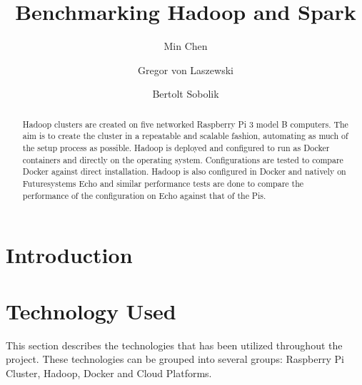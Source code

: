 \title{Benchmarking Hadoop and Spark}


\author{Min Chen}

\author{Gregor von Laszewski}

\author{Bertolt Sobolik}


\renewcommand{\shortauthors}{M. Chen, G. v. Laszewski, B. Sobolik}


\begin{abstract}
Hadoop clusters are created on five networked Raspberry Pi 3 model B
computers. The aim is to create the cluster in a repeatable and
scalable fashion, automating as much of the setup process as
possible. Hadoop is deployed and configured to run as Docker
containers and directly on the operating system. Configurations are
tested to compare Docker against direct installation. Hadoop is also
configured in Docker and natively on Futuresystems Echo and similar
performance tests are done to compare the performance of the
configuration on Echo against that of the Pis.
\end{abstract}



\maketitle

\section{Introduction}


\section{Technology Used}

This section describes the technologies that has been utilized throughout 
the project. These technologies can be grouped into several groups: 
Raspberry Pi Cluster, Hadoop, Docker and Cloud Platforms.

